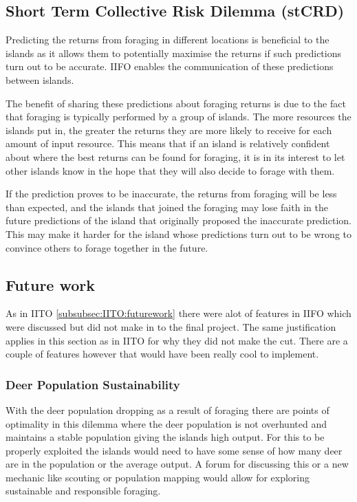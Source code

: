 \subsection{Short Term Collective Risk Dilemma (stCRD)}
\label{subsec:IIFO:stCRD}

Predicting the returns from foraging in different locations is beneficial to the islands as it allows them to potentially maximise the returns if such predictions turn out to be accurate. IIFO enables the communication of these predictions between islands.

The benefit of sharing these predictions about foraging returns is due to the fact that foraging is typically performed by a group of islands. The more resources the islands put in, the greater the returns they are more likely to receive for each amount of input resource. This means that if an island is relatively confident about where the best returns can be found for foraging, it is in its interest to let other islands know in the hope that they will also decide to forage with them.

If the prediction proves to be inaccurate, the returns from foraging will be less than expected, and the islands that joined the foraging may lose faith in the future predictions of the island that originally proposed the inaccurate prediction. This may make it harder for the island whose predictions turn out to be wrong to convince others to forage together in the future.
\subsection{Future work}
As in IITO \ref{subsubsec:IITO:futurework} there were alot of features in IIFO which were discussed but did not make in to the final project. The same justification applies in this section as in IITO for why they did not make the cut. There are a couple of features however that would have been really cool to implement.
\subsubsection{Deer Population Sustainability}
With the deer population dropping as a result of foraging there are points of optimality in this dilemma where the deer population is not overhunted and maintains a stable population giving the islands high output. For this to be properly exploited the islands would need to have some sense of how many deer are in the population or the average output. A forum for discussing this or a new mechanic like scouting or population mapping would allow for exploring sustainable and responsible foraging.
